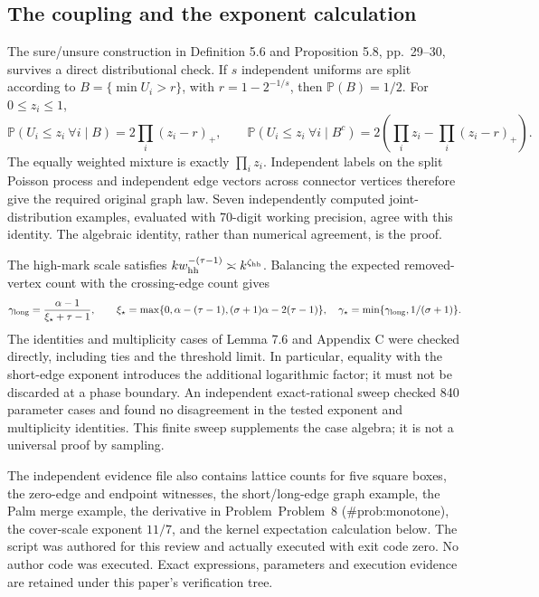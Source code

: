 \documentclass[10pt]{article}
\begin{document}
\subsection*{The coupling and the exponent calculation}
The sure/unsure construction in Definition 5.6 and Proposition 5.8, pp. 29–30, survives a direct distributional check. If \(s\) independent uniforms are split according to \(B=\{\min U_i>r\}\), with \(r=1-2^{-1/s}\), then \(\mathbb P(B)=1/2\). For \(0\leq z_i\leq1\), \[\mathbb P(U_i\leq z_i\ \forall i\mid B)
   =2\prod_i(z_i-r)_+,\qquad
 \mathbb P(U_i\leq z_i\ \forall i\mid B^c)
   =2\left(\prod_i z_i-\prod_i(z_i-r)_+\right).\] The equally weighted mixture is exactly \(\prod_i z_i\). Independent labels on the split Poisson process and independent edge vectors across connector vertices therefore give the required original graph law. Seven independently computed joint-distribution examples, evaluated with 70-digit working precision, agree with this identity. The algebraic identity, rather than numerical agreement, is the proof.\par
The high-mark scale satisfies \(k w_{\rm hh}^{-(\tau-1)}\asymp k^{\zeta_{\rm hh}}\). Balancing the expected removed-vertex count with the crossing-edge count gives \[\gamma_{\rm long}
  =\frac{\alpha-1}{\xi_\star+\tau-1},\qquad
 \xi_\star=\max\{0,\alpha-(\tau-1),
                  (\sigma+1)\alpha-2(\tau-1)\},
 \quad
 \gamma_\star=\min\{\gamma_{\rm long},1/(\sigma+1)\}.\] The identities and multiplicity cases of Lemma 7.6 and Appendix C were checked directly, including ties and the threshold limit. In particular, equality with the short-edge exponent introduces the additional logarithmic factor; it must not be discarded at a phase boundary. An independent exact-rational sweep checked 840 parameter cases and found no disagreement in the tested exponent and multiplicity identities. This finite sweep supplements the case algebra; it is not a universal proof by sampling.\par
The independent evidence file also contains lattice counts for five square boxes, the zero-edge and endpoint witnesses, the short/long-edge graph example, the Palm merge example, the derivative in Problem Problem 8 (\#prob:monotone), the cover-scale exponent \(11/7\), and the kernel expectation calculation below. The script was authored for this review and actually executed with exit code zero. No author code was executed. Exact expressions, parameters and execution evidence are retained under this paper’s verification tree.\par
\end{document}

